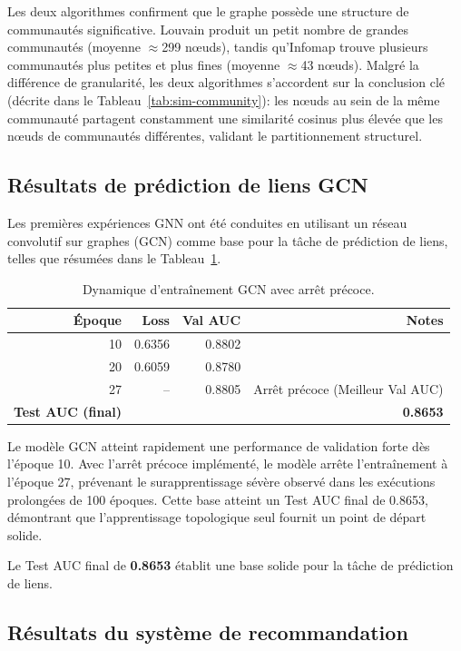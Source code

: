 Les deux algorithmes confirment que le graphe possède une structure de communautés significative. Louvain produit un petit nombre de grandes communautés (moyenne $\approx$299 nœuds), tandis qu'Infomap trouve plusieurs communautés plus petites et plus fines (moyenne $\approx$43 nœuds). Malgré la différence de granularité, les deux algorithmes s'accordent sur la conclusion clé (décrite dans le Tableau~\ref{tab:sim-community}): les nœuds au sein de la même communauté partagent constamment une similarité cosinus plus élevée que les nœuds de communautés différentes, validant le partitionnement structurel.

\subsection{Résultats de prédiction de liens GCN}

Les premières expériences GNN ont été conduites en utilisant un réseau convolutif sur graphes (GCN) comme base pour la tâche de prédiction de liens, telles que résumées dans le Tableau~\ref{tab:gcn-results}.

\begin{table}[htbp]
\centering
\caption{Dynamique d'entraînement GCN avec arrêt précoce.}
\label{tab:gcn-results}
\begin{tabular}{rrrr}
\toprule
\textbf{Époque} & \textbf{Loss} & \textbf{Val AUC} & \textbf{Notes} \\
\midrule
10 & 0.6356 & 0.8802 & \\
20 & 0.6059 & 0.8780 & \\
27 & --     & 0.8805 & Arrêt précoce (Meilleur Val AUC) \\
\midrule
\textbf{Test AUC (final)} & \multicolumn{3}{r}{\textbf{0.8653}} \\
\bottomrule
\end{tabular}
\end{table}

Le modèle GCN atteint rapidement une performance de validation forte dès l'époque 10. Avec l'arrêt précoce implémenté, le modèle arrête l'entraînement à l'époque 27, prévenant le surapprentissage sévère observé dans les exécutions prolongées de 100 époques. Cette base atteint un Test AUC final de 0.8653, démontrant que l'apprentissage topologique seul fournit un point de départ solide.

Le Test AUC final de \textbf{0.8653} établit une base solide pour la tâche de prédiction de liens.

\subsection{Résultats du système de recommandation}


